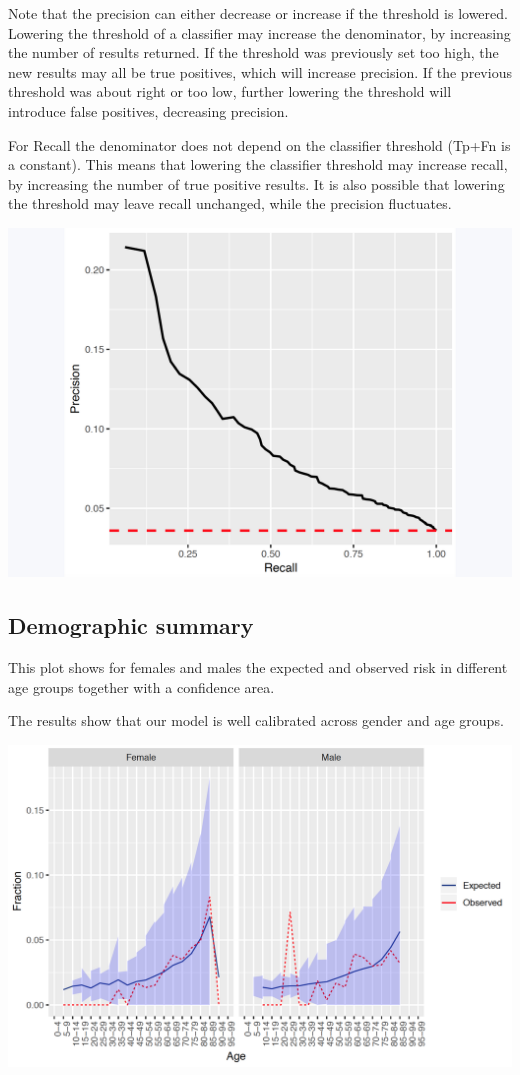 \documentclass[]{book}
\begin{document}
Note that the precision can either decrease or increase if the threshold
is lowered. Lowering the threshold of a classifier may increase the
denominator, by increasing the number of results returned. If the
threshold was previously set too high, the new results may all be true
positives, which will increase precision. If the previous threshold was
about right or too low, further lowering the threshold will introduce
false positives, decreasing precision.

For Recall the denominator does not depend on the classifier threshold
(Tp+Fn is a constant). This means that lowering the classifier threshold
may increase recall, by increasing the number of true positive results.
It is also possible that lowering the threshold may leave recall
unchanged, while the precision fluctuates.

\includegraphics[width=1\linewidth]{images/PatientLevelPrediction/precisionRecall}

\newpage

\subsection{Demographic summary}\label{demographic-summary}

This plot shows for females and males the expected and observed risk in
different age groups together with a confidence area.

The results show that our model is well calibrated across gender and age
groups.

\includegraphics[width=1\linewidth]{images/PatientLevelPrediction/demographicSummary}
\end{document}
